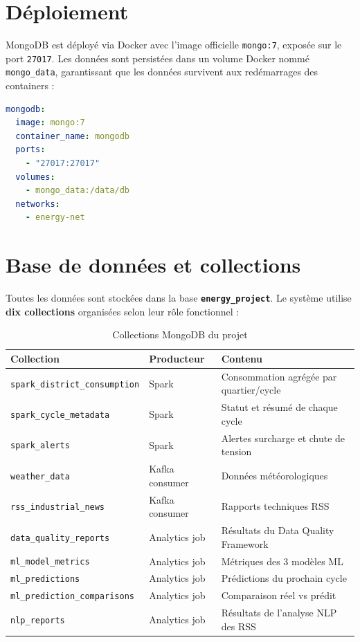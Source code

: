 \documentclass[1pt,a4paper]{report}
\begin{document}
\section{Déploiement}

MongoDB est déployé via Docker avec l'image officielle \texttt{mongo:7}, exposée sur
le port \texttt{27017}. Les données sont persistées dans un volume Docker nommé
\texttt{mongo\_data}, garantissant que les données survivent aux redémarrages des containers :

\begin{lstlisting}[language=yaml, caption={Configuration MongoDB dans Docker Compose}]
mongodb:
  image: mongo:7
  container_name: mongodb
  ports:
    - "27017:27017"
  volumes:
    - mongo_data:/data/db
  networks:
    - energy-net
\end{lstlisting}

\section{Base de données et collections}

Toutes les données sont stockées dans la base \textbf{\texttt{energy\_project}}.
Le système utilise \textbf{dix collections} organisées selon leur rôle fonctionnel :

\begin{table}[H]
\centering
\renewcommand{\arraystretch}{1.4}
\begin{tabular}{|l|l|l|}
\hline
\textbf{Collection} & \textbf{Producteur} & \textbf{Contenu} \\
\hline
\texttt{spark\_district\_consumption} & Spark & Consommation agrégée par quartier/cycle \\
\hline
\texttt{spark\_cycle\_metadata} & Spark & Statut et résumé de chaque cycle \\
\hline
\texttt{spark\_alerts} & Spark & Alertes surcharge et chute de tension \\
\hline
\texttt{weather\_data} & Kafka consumer & Données météorologiques \\
\hline
\texttt{rss\_industrial\_news} & Kafka consumer & Rapports techniques RSS \\
\hline
\texttt{data\_quality\_reports} & Analytics job & Résultats du Data Quality Framework \\
\hline
\texttt{ml\_model\_metrics} & Analytics job & Métriques des 3 modèles ML \\
\hline
\texttt{ml\_predictions} & Analytics job & Prédictions du prochain cycle \\
\hline
\texttt{ml\_prediction\_comparisons} & Analytics job & Comparaison réel vs prédit \\
\hline
\texttt{nlp\_reports} & Analytics job & Résultats de l'analyse NLP des RSS \\
\hline
\end{tabular}
\caption{Collections MongoDB du projet}
\label{tab:mongo_collections}
\end{table}
\end{document}
